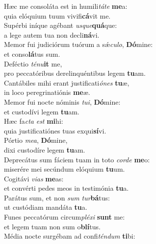 \evenverse Hæc me consoláta est in humili\textit{tá}\textit{te} \textbf{me}a:~\*\\
\evenverse quia elóquium tuum vivifi\textbf{cá}vit me.\\
\oddverse Supérbi iníque agébant \textit{us}\textit{que}\textbf{quá}que:~\*\\
\oddverse a lege autem tua non decli\textbf{ná}vi.\\
\evenverse Memor fui judiciórum tuórum a sǽ\textit{cu}\textit{lo}, \textbf{Dó}mine:~\*\\
\evenverse et conso\textbf{lá}tus sum.\\
\oddverse Deféctio \textit{té}\textit{nu}\textbf{it} me,~\*\\
\oddverse pro peccatóribus derelinquéntibus legem \textbf{tu}am.\\
\evenverse Cantábiles mihi erant justificati\textit{ó}\textit{nes} \textbf{tu}æ,~\*\\
\evenverse in loco peregrinatiónis \textbf{me}æ.\\
\oddverse Memor fui nocte nóminis \textit{tu}\textit{i}, \textbf{Dó}mine:~\*\\
\oddverse et custodívi legem \textbf{tu}am.\\
\evenverse Hæc fa\textit{cta} \textit{est} \textbf{mi}hi:~\*\\
\evenverse quia justificatiónes tuas exqui\textbf{sí}vi.\\
\oddverse Pórtio \textit{me}\textit{a}, \textbf{Dó}mine,~\*\\
\oddverse dixi custodíre legem \textbf{tu}am.\\
\evenverse Deprecátus sum fáciem tuam in toto \textit{cor}\textit{de} \textbf{me}o:~\*\\
\evenverse miserére mei secúndum elóquium \textbf{tu}um.\\
\oddverse Cogitávi \textit{vi}\textit{as} \textbf{me}as:~\*\\
\oddverse et convérti pedes meos in testimónia \textbf{tu}a.\\
\evenverse Parátus sum, et non \textit{sum} \textit{tur}\textbf{bá}tus:~\*\\
\evenverse ut custódiam mandáta \textbf{tu}a.\\
\oddverse Funes peccatórum circum\textit{plé}\textit{xi} \textbf{sunt} me:~\*\\
\oddverse et legem tuam non sum o\textbf{blí}tus.\\
\evenverse Média nocte surgébam ad confi\textit{tén}\textit{dum} \textbf{ti}bi:~\*\\
